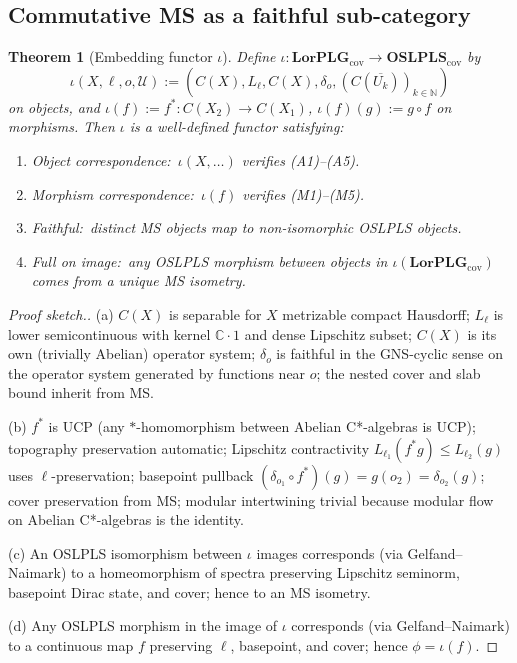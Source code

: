 \documentclass[11pt,a4paper]{article}
\theoremstyle{plain}
\newtheorem{theorem}{Theorem}[section]
\theoremstyle{definition}
\newcommand{\Ucal}{\mathcal{U}}
\newcommand{\C}{\mathbb{C}}
\newcommand{\N}{\mathbb{N}}
\newcommand{\LorPLG}{\mathbf{LorPLG}_{\mathrm{cov}}}
\newcommand{\OSLPLS}{\mathbf{OSLPLS}_{\mathrm{cov}}}
\begin{document}
\subsection{Commutative MS as a faithful sub-category}
\label{sec:commutative_embedding}

\begin{theorem}[Embedding functor $\iota$]\label{thm:embedding_iota}
Define $\iota:\LorPLG\to\OSLPLS$ by
\[
  \iota(X,\ell,o,\Ucal) := (C(X), L_{\ell}, C(X), \delta_{o}, (C(\overline{U_{k}}))_{k\in\N})
\]
on objects, and $\iota(f):=f^{*}:C(X_{2})\to C(X_{1})$, $\iota(f)(g):=
g\circ f$ on morphisms. Then $\iota$ is a well-defined functor
satisfying:
\begin{enumerate}
\item[(a)] Object correspondence:\ $\iota(X,\ldots)$ verifies
(A1)--(A5).
\item[(b)] Morphism correspondence:\ $\iota(f)$ verifies (M1)--(M5).
\item[(c)] Faithful:\ distinct MS objects map to non-isomorphic OSLPLS
objects.
\item[(d)] Full on image:\ any OSLPLS morphism between objects in
$\iota(\LorPLG)$ comes from a unique MS isometry.
\end{enumerate}
\end{theorem}

\begin{proof}[Proof sketch.]
(a) $C(X)$ is separable for $X$ metrizable compact Hausdorff;
$L_{\ell}$ is lower semicontinuous with kernel $\C\cdot 1$ and dense
Lipschitz subset; $C(X)$ is its own (trivially Abelian) operator
system; $\delta_{o}$ is faithful in the GNS-cyclic sense on the
operator system generated by functions near $o$; the nested cover and
slab bound inherit from MS.

(b) $f^{*}$ is UCP (any $*$-homomorphism between Abelian C*-algebras
is UCP); topography preservation automatic; Lipschitz contractivity
$L_{\ell_{1}}(f^{*}g)\le L_{\ell_{2}}(g)$ uses $\ell$-preservation;
basepoint pullback $(\delta_{o_{1}}\circ f^{*})(g)=g(o_{2})=
\delta_{o_{2}}(g)$; cover preservation from MS; modular intertwining
trivial because modular flow on Abelian C*-algebras is the identity.

(c) An OSLPLS isomorphism between $\iota$ images corresponds (via
Gelfand--Naimark) to a homeomorphism of spectra preserving Lipschitz
seminorm, basepoint Dirac state, and cover; hence to an MS isometry.

(d) Any OSLPLS morphism in the image of $\iota$ corresponds (via
Gelfand--Naimark) to a continuous map $f$ preserving $\ell$,
basepoint, and cover; hence $\phi=\iota(f)$.
\end{proof}
\end{document}

